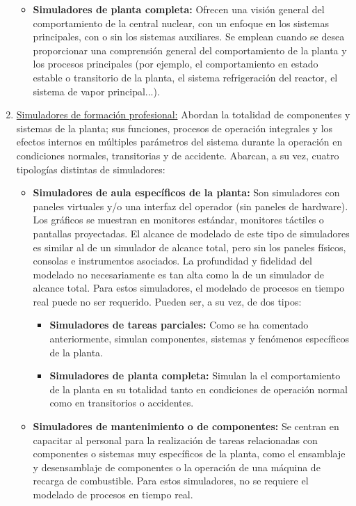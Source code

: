 \begin{enumerate}
\begin{itemize}
    \item \textbf{Simuladores de planta completa:} Ofrecen una visión general del comportamiento de la central nuclear, con un enfoque en los sistemas principales, con o sin los sistemas auxiliares. Se emplean cuando se desea proporcionar una comprensión general del comportamiento de la planta y los procesos principales (por ejemplo, el comportamiento en estado estable o transitorio de la planta, el sistema refrigeración del reactor, el sistema de vapor principal...).
  \end{itemize}
  \item \underline{Simuladores de formación profesional:} Abordan la totalidad de componentes y sistemas de la planta; sus funciones, procesos de operación integrales y los efectos internos en múltiples parámetros del sistema durante la operación en condiciones normales, transitorias y de accidente. Abarcan, a su vez, cuatro tipologías distintas de simuladores:
  \begin{itemize}
    \item \textbf{Simuladores de aula específicos de la planta:} Son simuladores con paneles virtuales y/o una interfaz del operador (sin paneles de hardware). Los gráficos se muestran en monitores estándar, monitores táctiles o pantallas proyectadas. El alcance de modelado de este tipo de simuladores es similar al de un simulador de alcance total, pero sin los paneles físicos, consolas e instrumentos asociados. La profundidad y fidelidad del modelado no necesariamente es tan alta como la de un simulador de alcance total. Para estos simuladores, el modelado de procesos en tiempo real puede no ser requerido. Pueden ser, a su vez, de dos tipos:
    \begin{itemize}
      \item \textbf{Simuladores de tareas parciales:} Como se ha comentado anteriormente, simulan componentes, sistemas y fenómenos específicos de la planta.
      \item \textbf{Simuladores de planta completa:} Simulan la el comportamiento de la planta en su totalidad tanto en condiciones de operación normal como en transitorios o accidentes.
    \end{itemize}
    \item \textbf{Simuladores de mantenimiento o de componentes:} Se centran en capacitar al personal para la realización de tareas relacionadas con componentes o sistemas muy específicos de la planta, como el ensamblaje y desensamblaje de componentes o la operación de una máquina de recarga de combustible. Para estos simuladores, no se requiere el modelado de procesos en tiempo real.

\end{itemize}
\end{enumerate}
